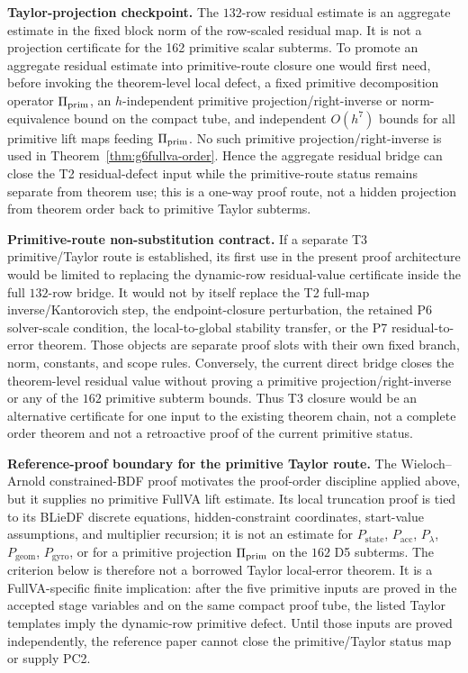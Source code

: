 \documentclass[preprint,12pt]{elsarticle}
\begin{document}
\noindent\textbf{Taylor-projection checkpoint.}
The \(132\)-row residual estimate is an aggregate estimate in the fixed block
norm of the row-scaled residual map.  It is not a projection certificate for
the 162 primitive scalar subterms.  To promote an aggregate residual estimate
into primitive-route closure one would first need, before invoking the
theorem-level local defect, a fixed primitive decomposition operator
\(\Pi_{\rm prim}\), an \(h\)-independent primitive projection/right-inverse
or norm-equivalence bound on the compact tube, and independent \(O(h^7)\)
bounds for all primitive lift maps feeding \(\Pi_{\rm prim}\).  No such
primitive projection/right-inverse is used in
Theorem~\ref{thm:g6fullva-order}.  Hence the aggregate residual bridge can
close the T2 residual-defect input while the primitive-route status
remains separate from theorem use; this is a one-way proof route, not a hidden projection from
theorem order back to primitive Taylor subterms.

\noindent\textbf{Primitive-route non-substitution contract.}
If a separate T3 primitive/Taylor route is established, its first use
in the present proof architecture would be limited to replacing the
dynamic-row residual-value certificate inside the full \(132\)-row bridge. It
would not by itself replace the T2 full-map inverse/Kantorovich step, the
endpoint-closure perturbation, the retained P6 solver-scale condition, the
local-to-global stability transfer, or the P7 residual-to-error theorem. Those
objects are separate proof slots with their own fixed branch, norm, constants,
and scope rules. Conversely, the current direct bridge closes the
theorem-level residual value without proving a primitive projection/right-inverse
or any of the \(162\) primitive subterm bounds. Thus T3 closure would be an
alternative certificate for one input to the existing theorem chain, not a
complete order theorem and not a retroactive proof of the current primitive
status.

\noindent\textbf{Reference-proof boundary for the primitive Taylor route.}
The Wieloch--Arnold constrained-BDF proof motivates the proof-order discipline applied
above, but it supplies no primitive FullVA lift estimate.  Its local
truncation proof is tied to its BLieDF discrete equations, hidden-constraint
coordinates, start-value assumptions, and multiplier recursion; it is not an
estimate for \(P_{\mathrm{state}}\), \(P_{\mathrm{acc}}\),
\(P_{\lambda}\), \(P_{\mathrm{geom}}\), \(P_{\mathrm{gyro}}\), or for a
primitive projection \(\Pi_{\rm prim}\) on the \(162\) D5 subterms.  The
criterion below is therefore not a borrowed Taylor local-error theorem.  It
is a FullVA-specific finite implication: after the five primitive inputs are
proved in the accepted stage variables and on the same compact proof tube,
the listed Taylor templates imply the dynamic-row primitive defect.  Until
those inputs are proved independently, the reference paper cannot close the
primitive/Taylor status map or supply PC2.
\end{document}
